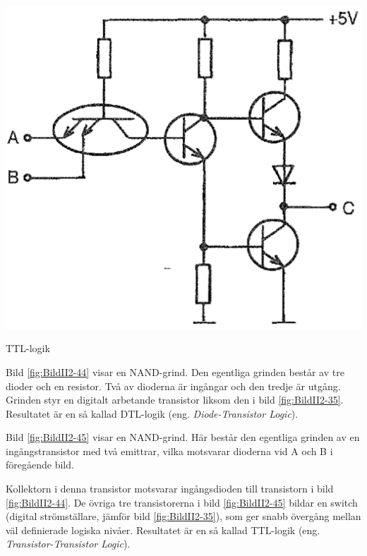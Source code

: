 \begin{marginfigure}
	\vspace{\baselineskip}
	\includegraphics[]{images/cropped_pdfs/bild_2_2-45.pdf}
	\caption{TTL-logik}
	\label{fig:BildII2-45}
\end{marginfigure}

Bild \ref{fig:BildII2-44} visar en NAND-grind.
Den egentliga grinden består av tre dioder och en resistor.
Två av dioderna är ingångar och den tredje är utgång.
Grinden styr en digitalt arbetande transistor liksom den i bild
\ref{fig:BildII2-35}.
Resultatet är en så kallad DTL-logik (eng. \emph{Diode-Transistor Logic}).

Bild \ref{fig:BildII2-45} visar en NAND-grind.
Här består den egentliga grinden av en ingångstransistor med två emittrar,
vilka motsvarar dioderna vid A och B i föregående bild.

Kollektorn i denna transistor motsvarar ingångsdioden till transistorn i bild
\ref{fig:BildII2-44}.
De övriga tre transistorerna i bild \ref{fig:BildII2-45} bildar en switch (digital strömställare, jämför bild \ref{fig:BildII2-35}),
som ger snabb övergång mellan väl definierade logiska nivåer.
Resultatet är en så kallad TTL-logik (eng. \emph{Transistor-Transistor Logic}).
